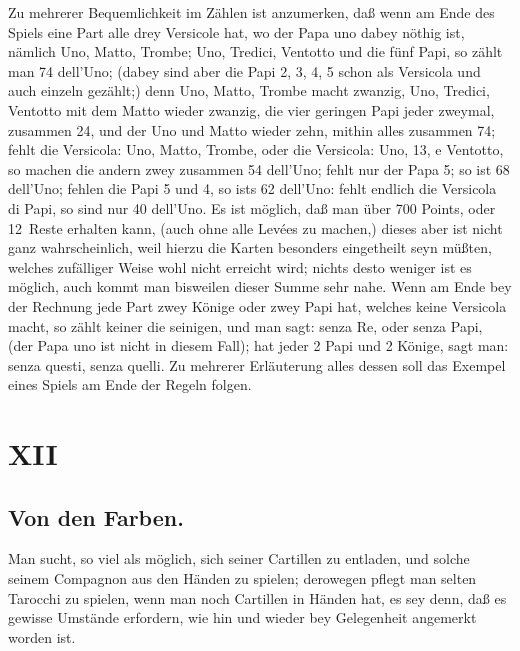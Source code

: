 \documentclass[11pt,a6paper,twoside]{article}
\begin{document}
Zu mehrerer Bequemlichkeit im Zählen ist anzumerken, daß wenn am Ende des Spiels eine Part alle drey Versicole hat, wo der Papa uno dabey nöthig ist, nämlich Uno, Matto, Trombe; Uno, Tredici, Ventotto und die fünf Papi, so zählt man 74 dell'Uno; (dabey sind aber die Papi 2, 3, 4, 5 schon als Versicola und auch einzeln gezählt;) denn Uno, Matto, Trombe macht zwanzig, Uno, Tredici, Ventotto mit dem Matto wieder zwanzig, die vier geringen Papi jeder zweymal, zusammen 24, und der Uno und Matto wieder zehn, mithin alles zusammen 74; fehlt die Versicola: Uno, Matto, Trombe, oder die Versicola: Uno, 13, e Ventotto, so machen die andern zwey zusammen 54 dell'Uno; fehlt nur der Papa 5; so ist 68 dell'Uno; fehlen die Papi 5 und 4, so ists 62 dell'Uno: fehlt endlich die Versicola di Papi, so sind nur 40 dell'Uno. Es ist möglich, daß man über 700 Points, oder 12~Reste erhalten kann, (auch ohne alle Levées zu machen,) dieses aber ist nicht ganz wahrscheinlich, weil hierzu die Karten besonders eingetheilt seyn müßten, welches zufälliger Weise wohl nicht erreicht wird; nichts desto weniger ist es möglich, auch kommt man bisweilen dieser Summe sehr nahe. Wenn am Ende bey der Rechnung jede Part zwey Könige oder zwey Papi hat, welches keine Versicola macht, so zählt keiner die seinigen, und man sagt: senza Re, oder senza Papi, (der Papa uno ist nicht in diesem Fall); hat jeder 2 Papi und 2 Könige, sagt man: senza questi, senza quelli. Zu mehrerer Erläuterung alles dessen soll das Exempel eines Spiels am Ende der Regeln folgen.

\section{XII}
\subsection{Von den Farben.}

Man sucht, so viel als möglich, sich seiner Cartillen zu entladen, und solche seinem Compagnon aus den Händen zu spielen; derowegen pflegt man selten Tarocchi zu spielen, wenn man noch Cartillen in Händen hat, es sey denn, daß es gewisse Umstände erfordern, wie hin und wieder bey Gelegenheit angemerkt worden ist.
\end{document}
